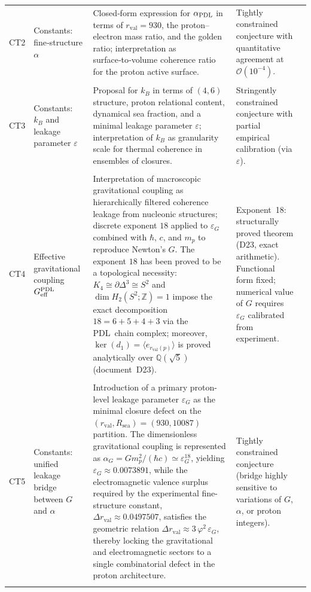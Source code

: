 \documentclass[11pt,a4paper]{article}
\newcommand{\PDL}{\textnormal{PDL}}
\begin{document}
\begin{longtable}{L{0.8cm}L{1.9cm}L{5.9cm}L{3cm}L{2.2cm}}
CT2 &
Constants: fine‑structure $\alpha$ &
Closed‑form expression for $\alpha_{\PDL}$ in terms of $r_{\mathrm{val}}=930$, the proton–electron mass ratio, and the golden ratio; interpretation as surface‑to‑volume coherence ratio for the proton active surface. &
Tightly constrained conjecture with quantitative agreement at $\mathcal{O}(10^{-4})$. &
\citep{Alpha_PDL_v2_2026,Born_Golden_v2_2026,PDL_intro,PDL_position} \\\\[0.4em]

CT3 &
Constants: $k_B$ and leakage parameter $\varepsilon$ &
Proposal for $k_B$ in terms of $(4,6)$ structure, proton relational content, dynamical sea fraction, and a minimal leakage parameter $\varepsilon$; interpretation of $k_B$ as granularity scale for thermal coherence in ensembles of closures. &
Stringently constrained conjecture with partial empirical calibration (via $\varepsilon$). &
\citep{PDL_Main_2026,Coherence_Leakage_18_2026,PDL_position} \\\\[0.4em]

CT4 &
Effective gravitational coupling $G_{\mathrm{eff}}^{\PDL}$ &
Interpretation of macroscopic gravitational coupling as hierarchically filtered coherence leakage from nucleonic structures; discrete exponent $18$ applied to $\varepsilon_G$ combined with $\hbar$, $c$, and $m_p$ to reproduce Newton's $G$. The exponent $18$ has been proved to be a topological necessity: $K_4 \cong \partial\Delta^3 \cong S^2$ and $\dim H_2(S^2;\mathbb{Z}) = 1$ impose the exact decomposition $18 = 6+5+4+3$ via the \PDL\ chain complex; moreover, $\ker(d_1) = \langle e_{r_{\mathrm{val}}(p)}\rangle$ is proved analytically over $\mathbb{Q}(\sqrt{5})$ (document~D23). &
Exponent~18: structurally proved theorem (D23, exact arithmetic). Functional form fixed; numerical value of $G$ requires $\varepsilon_G$ calibrated from experiment. &
\citep{Exponent_18_PDL_2026,Coherence_Leakage_18_2026,PDL_Main_2026,Topology_18_PDL_2026,PDL_position} \\\\[0.4em]

CT5 &
Constants: unified leakage bridge between $G$ and $\alpha$ &
Introduction of a primary proton-level leakage parameter $\varepsilon_G$ as the minimal closure defect on the $(r_{\mathrm{val}},R_{\mathrm{sea}})=(930,10087)$ partition. The dimensionless gravitational coupling is represented as $\alpha_G = G m_p^2 / (\hbar c) \simeq \varepsilon_G^{18}$, yielding $\varepsilon_G \approx 0.0073891$, while the electromagnetic valence surplus required by the experimental fine-structure constant, $\Delta r_{\mathrm{val}} \approx 0.0497507$, satisfies the geometric relation $\Delta r_{\mathrm{val}} \approx 3\,\varphi^2\,\varepsilon_G$, thereby locking the gravitational and electromagnetic sectors to a single combinatorial defect in the proton architecture. &
Tightly constrained conjecture (bridge highly sensitive to variations of $G$, $\alpha$, or proton integers). &
\citep{Exponent_18_PDL_2026,Alpha_PDL_v2_2026,Universal_Coherence_Leakage_V3_2026} \\\\[0.4em]



\end{longtable}
\end{document}
